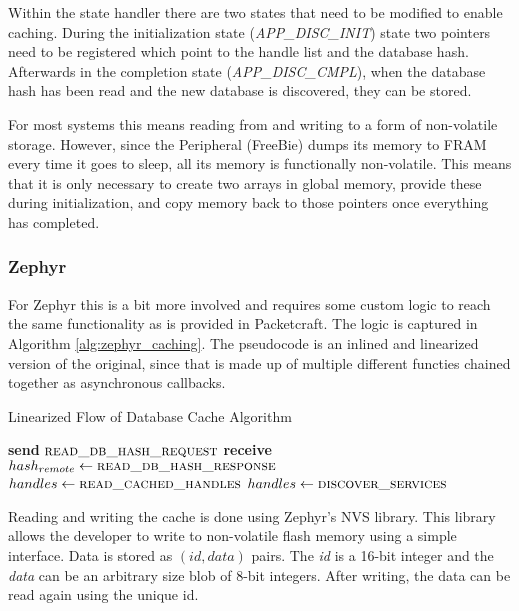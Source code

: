 Within the state handler there are two states that need to be modified to enable caching. During the initialization state (\textit{APP\_DISC\_INIT}) state two pointers need to be registered which point to the handle list and the database hash. Afterwards in the completion state (\textit{APP\_DISC\_CMPL}), when the database hash has been read and the new database is discovered, they can be stored.

For most systems this means reading from and writing to a form of non-volatile storage. However, since the Peripheral (FreeBie) dumps its memory to FRAM every time it goes to sleep, all its memory is functionally non-volatile. This means that it is only necessary to create two arrays in global memory, provide these during initialization, and copy memory back to those pointers once everything has completed.

\subsubsection{Zephyr}
For Zephyr this is a bit more involved and requires some custom logic to reach the same functionality as is provided in Packetcraft. The logic is captured in Algorithm \ref{alg:zephyr_caching}. The pseudocode is an inlined and linearized version of the original, since that is made up of multiple different functies chained together as asynchronous callbacks.

\begin{algorithm}
    \caption{Linearized Flow of Database Cache Algorithm}
    \label{alg:zephyr_caching}
    \begin{algorithmic}[1] 
            \State \textbf{send} $\Call{read\_db\_hash\_request}{}$
            \State \textbf{receive} $hash_{remote} \gets \Call{read\_db\_hash\_response}{}$
                    \State $handles \gets \Call{read\_cached\_handles}{}$
                    \State {}
                    \State \Return
                \EndIf
            \EndIf
            \State $handles \gets\Call{discover\_services}{}$
            \State {}
            \State {}
        \EndProcedure
    \end{algorithmic}
\end{algorithm}

Reading and writing the cache is done using Zephyr's NVS library. This library allows the developer to write to non-volatile flash memory using a simple interface. Data is stored as $(id, data)$ pairs. The \textit{id} is a 16-bit integer and the \textit{data} can be an arbitrary size blob of 8-bit integers. After writing, the data can be read again using the unique id.


